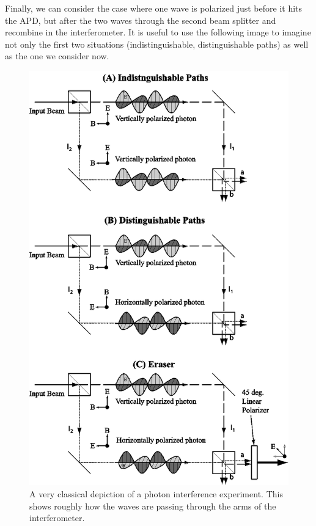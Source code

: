 \documentclass{article}
\begin{document}
	\hspace{.5cm}

	Finally, we can consider the case where one wave is polarized just before it hits the APD, but after the two waves through the second beam splitter and recombine in the interferometer.  It is useful to use the following image to imagine not only the first two situations (indistinguishable, distinguishable paths) as well as the one we consider now.

	\begin{figure}[!htb]
		\centering
		\includegraphics[scale=.5]{interferometer_wave.png}
		\caption{A very classical depiction of a photon interference experiment.  This shows roughly how the waves are passing through the arms of the interferometer.}
	\end{figure}
\end{document}
